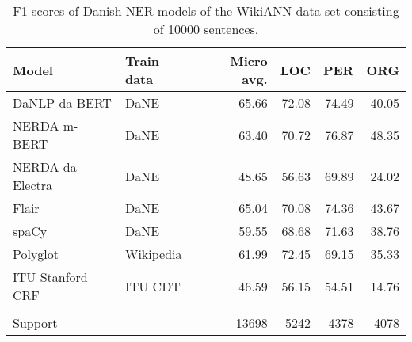 \documentclass[main.tex]{subfiles}
\begin{document}
\begin{table}[H]
	\begin{center}
		\begin{tabular}{l l r r r r}
			Model & Train data & Micro avg. & LOC & PER & ORG \\
			\hline
			DaNLP da-BERT & DaNE & 65.66 & 72.08 & 74.49 & 40.05 \\
			NERDA m-BERT & DaNE & 63.40 & 70.72 & 76.87 & 48.35 \\
			NERDA da-Electra & DaNE & 48.65 & 56.63 & 69.89 & 24.02 \\
			Flair & DaNE & 65.04 & 70.08 & 74.36 & 43.67 \\
			spaCy & DaNE & 59.55 & 68.68 & 71.63 & 38.76 \\
			Polyglot & Wikipedia & 61.99 & 72.45 & 69.15 & 35.33 \\
			ITU Stanford CRF & ITU CDT & 46.59 & 56.15 & 54.51 & 14.76 \\
			 &  &  &  &  &  \\
			Support &  & 13698 & 5242 & 4378 & 4078 \\
		\end{tabular}
	\end{center}
	\caption{F1\pro-scores of Danish NER models of the WikiANN data-set consisting of 10000 sentences.}
	\label{tab:WikiANN}
\end{table}
\end{document}
